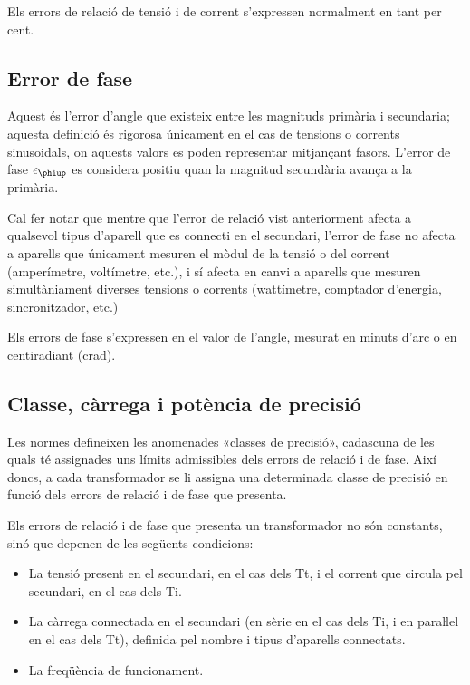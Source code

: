 Els errors de relació de tensió i de corrent s'expressen
normalment en tant per cent.

\subsection{Error de fase}

Aquest és l'error d'angle  que existeix entre les magnituds primària i
secundaria; aquesta definició és rigorosa únicament en el cas de
tensions o corrents sinusoidals, on aquests valors es poden
representar mitjançant fasors. L'error de fase $\epsilon\ped{\phiup}$ es considera positiu quan la magnitud secundària avança a la primària.
\index{$\epsilon\ped{\phiup}$}

 Cal fer notar que mentre que l'error de relació
vist anteriorment afecta a qualsevol tipus d'aparell que es
connecti en el secundari, l'error de fase no afecta a aparells que
únicament mesuren el mòdul de la tensió o del corrent (amperímetre,
voltímetre, etc.), i sí afecta en canvi a aparells que mesuren
simultàniament diverses tensions o corrents (wattímetre, comptador
d'energia, sincronitzador, etc.)

Els errors de fase s'expressen en el valor de l'angle, mesurat en
minuts d'arc o en centiradiant (crad).

\subsection{Classe, càrrega i potència de precisió}

Les normes defineixen les anomenades «classes de precisió»,
cadascuna de les quals té assignades uns límits admissibles dels
errors de relació i de fase. Així doncs, a cada transformador
se li assigna una determinada classe de precisió en funció dels errors
de relació i de fase que presenta.

Els errors de relació i de fase que presenta un transformador no són
constants, sinó que depenen de les següents condicions:
\begin{itemize}
   \item La tensió present en el secundari, en el cas dels Tt, i el corrent que
   circula    pel secundari, en el cas dels Ti.
   \item La càrrega connectada en el secundari (en sèrie en el cas dels Ti,
   i en paraŀlel en el cas dels Tt), definida pel nombre i tipus d'aparells connectats.
   \item La freqüència de funcionament.
\end{itemize}

